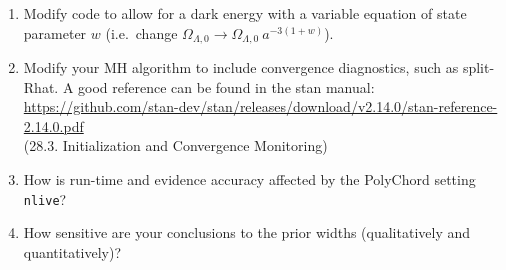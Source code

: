 \documentclass{article}
\begin{document}
\begin{enumerate}[resume]
    \item Modify code to allow for a dark energy with a variable equation of state parameter $w$ (i.e.\ change $\Omega_{\Lambda,0}\to\Omega_{\Lambda,0}\: a^{-3(1+w)}$).
    \item Modify your MH algorithm to include convergence diagnostics, such as split-Rhat. A good reference can be found in the stan manual:\\
        \url{https://github.com/stan-dev/stan/releases/download/v2.14.0/stan-reference-2.14.0.pdf}\\ 
        (28.3. Initialization and Convergence Monitoring)

    \item How is run-time and evidence accuracy affected by the PolyChord setting \lstinline{nlive}?
    \item How sensitive are your conclusions to the prior widths (qualitatively and quantitatively)?
\end{enumerate}
\end{document}
